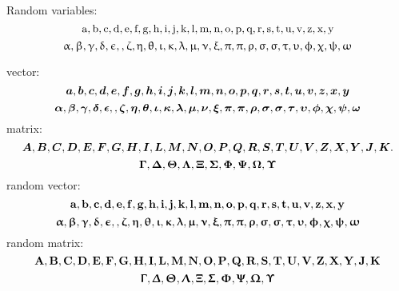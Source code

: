  Random variables:
 \begin{equation}
    \ra, \rb, \rc, \rd, \re, \rf, \rg, \rh, \ri, \rj, \rk, \rl, \rm ,\rn, \ro, \rp, \rq, \rr, \rs, \rt ,\ru, \rv, \rz, \rx, \ry 
 \end{equation}
 \begin{equation}
    \ralpha, \rbeta, \rgamma, \rdelta, \reps,, \rzeta, \reta, \rtheta, \riota, \rkappa, \rlambda, \rmu, \rnu, \rxi, \rpi,\rpi, \rrho, \rsigma, \rsigma, \rtau, \rupsilon, \rphi, \rchi, \rpsi, \romega
 \end{equation}

 vector:
 \begin{equation}
    \va, \vb, \vc, \vd, \ve, \vf, \vg, \vh, \vi, \vj, \vk, \vl, \vm ,\vn, \vo, \vp, \vq, \vr, \vs, \vt ,\vu, \vv, \vz, \vx, \vy 
 \end{equation}
 \begin{equation}
    \valpha, \vbeta, \vgamma, \vdelta, \veps,, \vzeta, \veta, \vtheta, \viota, \vkappa, \vlambda, \vmu, \vnu, \vxi, \vpi,\vpi, \vrho, \vsigma, \vsigma, \vtau, \vupsilon, \vphi, \vchi, \vpsi, \vomega
 \end{equation}
 matrix:
 \begin{equation}
    \mA, \mB, \mC, \mD, \mE, \mF, \mG, \mH, \mI, \mL, \mM, \mN, \mO, \mP, \mQ, \mR, \mS, \mT, \mU, \mV, \mZ, \mX, \mY, \mJ, \mK. 
 \end{equation}
 \begin{equation}
    \mGamma, \mDelta, \mTheta, \mLambda, \mXi, \mSigma, \mPhi, \mPsi, \mOmega, \mUpsilon
    \end{equation}
 random vector:
 \begin{equation}
    \rva, \rvb, \rvc, \rvd, \rve, \rvf, \rvg, \rvh, \rvi, \rvj, \rvk, \rvl, \rvm ,\rvn, \rvo, \rvp, \rvq, \rvr, \rvs, \rvt ,\rvu, \rvv, \rvz, \rvx, \rvy
 \end{equation}
 \begin{equation}
    \rvalpha, \rvbeta, \rvgamma, \rvdelta, \rveps,, \rvzeta, \rveta, \rvtheta, \rviota, \rvkappa, \rvlambda, \rvmu, \rvnu, \rvxi, \rvpi,\rvpi, \rvrho, \rvsigma, \rvsigma, \rvtau, \rvupsilon, \rvphi, \rvchi, \rvpsi, \rvomega
 \end{equation}
 random matrix:
 \begin{equation}
    \rmA, \rmB, \rmC, \rmD, \rmE, \rmF, \rmG, \rmH, \rmI, \rmL, \rmM, \rmN, \rmO, \rmP, \rmQ, \rmR, \rmS, \rmT, \rmU, \rmV, \rmZ, \rmX, \rmY, \rmJ, \rmK 
 \end{equation}
 \begin{equation}
    \rmGamma, \rmDelta, \rmTheta, \rmLambda, \rmXi, \rmSigma, \rmPhi, \rmPsi, \rmOmega, \rmUpsilon
    \end{equation}
